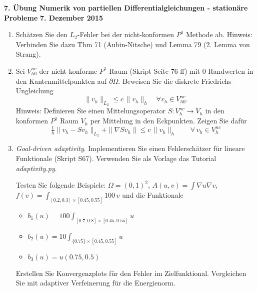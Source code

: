 \documentclass[11pt,a4paper]{report}
\begin{document}
\begin{center}
\textbf{7. \"Ubung Numerik von partiellen Differentialgleichungen - station\"are Probleme} \newline 
\textbf{7. Dezember 2015}
\end{center}
\begin{enumerate}

\item
Sch\"atzen Sie den $L_2$-Fehler bei der nicht-konformen $P^1$ Methode
ab. \newline
Hinweis: Verbinden Sie dazu Thm 71 (Aubin-Nitsche) und Lemma 79
(2. Lemma von Strang). 

\item
  Sei $V_{h0}^{nc}$ der nicht-konforme $P^1$ Raum (Skript Seite 76 ff)
 mit $0$ Randwerten in den Kantenmittelpunkten auf $\partial \Omega$.
Beweisen Sie die diskrete Friedrichs-Ungleichung
 $$
 \| v_h \|_{L_2} \leq  c \, \| v_h \|_h  \quad \forall v_h \in V_{h0}^{nc}.
 $$
Hinweis: Definieren Sie einen Mittelungsoperator $S : V_h^{nc}
\rightarrow V_h$ in den konformen $P^1$ Raum $V_h$ per Mittelung in
den Eckpunkten.
Zeigen Sie daf\"ur
$$
\tfrac{1}{h} \| v_h - S v_h \|_{L_2} + \| \nabla S v_h \| \leq c \, \|
v_h \|_h
\qquad \forall \, v_h \in V_h^{nc}
$$


\item {\em Goal-driven adaptivity}. Implementieren Sie einen
  Fehlersch\"atzer  f\"ur lineare Funktionale (Skript S67). Verwenden
  Sie als Vorlage das Tutorial {\em adaptivity.py}. 

  Testen Sie folgende Beispiele: $\Omega = (0,1)^2$, $A(u,v) = \int
  \nabla u \nabla v$, $f(v) = \int_{[0.2,0.3] \times [0.45,0.55]}  100
  \, v$ und die Funktionale
  \begin{itemize}
  \item $b_1(u) = 100 \int_{[0.7,0.8] \times [0.45,0.55]}  u$
  \item $b_2(u) = 10 \int_{\{0.75\} \times [0.45,0.55]} u$
    \item $b_3(u) = u(0.75, 0.5)$
  \end{itemize}

Erstellen Sie Konvergenzplots f\"ur den Fehler im
Zielfunktional. Vergleichen Sie mit adaptiver Verfeinerung f\"ur die Energienorm.
  
\end{enumerate}
\end{document}
